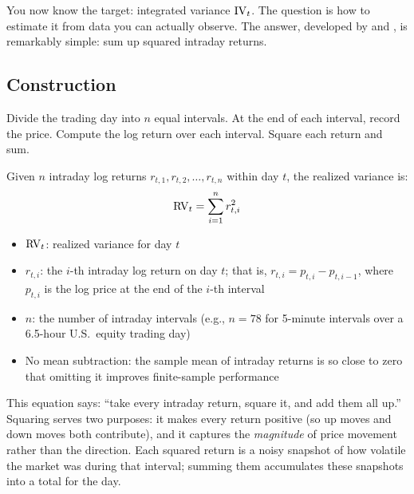 You now know the target: integrated variance $\operatorname{IV}_t$.
The question is how to estimate it from data you can actually observe.
The answer, developed by \citet{ABDL2001} and \citet{BNS2002}, is remarkably simple: sum up squared intraday returns.

\subsection{Construction}

Divide the trading day into $n$ equal intervals.
At the end of each interval, record the price.
Compute the log return over each interval.
Square each return and sum.

\begin{definition}
Given $n$ intraday log returns $r_{t,1}, r_{t,2}, \ldots, r_{t,n}$ within day $t$, the realized variance is:
\begin{equation}
  \operatorname{RV}_t = \sum_{i=1}^{n} r^2_{t,i}
  \label{eq:rv}
\end{equation}
\begin{itemize}[nosep]
  \item $\operatorname{RV}_t$: realized variance for day $t$
  \item $r_{t,i}$: the $i$-th intraday log return on day $t$; that is, $r_{t,i} = p_{t,i} - p_{t,i-1}$, where $p_{t,i}$ is the log price at the end of the $i$-th interval
  \item $n$: the number of intraday intervals (e.g., $n = 78$ for 5-minute intervals over a 6.5-hour U.S.\ equity trading day)
  \item No mean subtraction: the sample mean of intraday returns is so close to zero that omitting it improves finite-sample performance \citep{ABDL2003}
\end{itemize}
\end{definition}

\begin{intuition}
This equation says: ``take every intraday return, square it, and add them all up.''
Squaring serves two purposes: it makes every return positive (so up moves and down moves both contribute), and it captures the \emph{magnitude} of price movement rather than the direction.
Each squared return is a noisy snapshot of how volatile the market was during that interval; summing them accumulates these snapshots into a total for the day.
\end{intuition}

